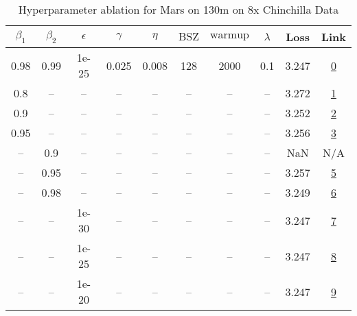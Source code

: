 \begin{table}[H]
\centering
\caption{Hyperparameter ablation for Mars on 130m on 8x Chinchilla Data}
\label{tab:ablation_mars_130m_8}
\begin{tabular}{cccccccccc}
\toprule
$\beta_1$ & $\beta_2$ & $\epsilon$ & $\gamma$ & $\eta$ & $\mathrm{BSZ}$ & $\mathrm{warmup}$ & $\lambda$ & Loss & Link \\
\midrule
0.98 & 0.99 & 1e-25 & 0.025 & 0.008 & 128 & 2000 & 0.1 & 3.247 & \href{https://wandb.ai/stanford-mercury/optimizer-scaling/runs/sweep-130m-21B-marse0bd33lr0.008-wd0.1-minlr0-warmup2000-b10.98--8e8f56}{0} \\
\midrule
0.8 & -- & -- & -- & -- & -- & -- & -- & 3.272 & \href{https://wandb.ai/stanford-mercury/optimizer-scaling/runs/sweep-130m-21B-marsf4b9a3lr0.008-wd0.1-minlr0-warmup2000-b10.8-b-7720d7}{1} \\
0.9 & -- & -- & -- & -- & -- & -- & -- & 3.252 & \href{https://wandb.ai/stanford-mercury/optimizer-scaling/runs/sweep-130m-21B-marsa14b1flr0.008-wd0.1-minlr0-warmup2000-b10.9-b-3cf5ea}{2} \\
0.95 & -- & -- & -- & -- & -- & -- & -- & 3.256 & \href{https://wandb.ai/stanford-mercury/optimizer-scaling/runs/sweep-130m-21B-marsa2ff9clr0.008-wd0.1-minlr0-warmup2000-b10.95--2b9b91}{3} \\
-- & 0.9 & -- & -- & -- & -- & -- & -- & NaN & N/A \\
-- & 0.95 & -- & -- & -- & -- & -- & -- & 3.257 & \href{https://wandb.ai/stanford-mercury/optimizer-scaling/runs/sweep-130m-21B-mars958a5alr0.008-wd0.1-minlr0-warmup2000-b10.98--43c96f}{5} \\
-- & 0.98 & -- & -- & -- & -- & -- & -- & 3.249 & \href{https://wandb.ai/stanford-mercury/optimizer-scaling/runs/sweep-130m-21B-mars10209dlr0.008-wd0.1-minlr0-warmup2000-b10.98--beb8d7}{6} \\
-- & -- & 1e-30 & -- & -- & -- & -- & -- & 3.247 & \href{https://wandb.ai/stanford-mercury/optimizer-scaling/runs/sweep-130m-21B-marse0bd33lr0.008-wd0.1-minlr0-warmup2000-b10.98--8e8f56}{7} \\
-- & -- & 1e-25 & -- & -- & -- & -- & -- & 3.247 & \href{https://wandb.ai/stanford-mercury/optimizer-scaling/runs/sweep-130m-21B-marse0bd33lr0.008-wd0.1-minlr0-warmup2000-b10.98--8e8f56}{8} \\
-- & -- & 1e-20 & -- & -- & -- & -- & -- & 3.247 & \href{https://wandb.ai/stanford-mercury/optimizer-scaling/runs/sweep-130m-21B-marsae79cflr0.008-wd0.1-minlr0-warmup2000-b10.98--d6a455}{9} \\

\end{tabular}
\end{table}
